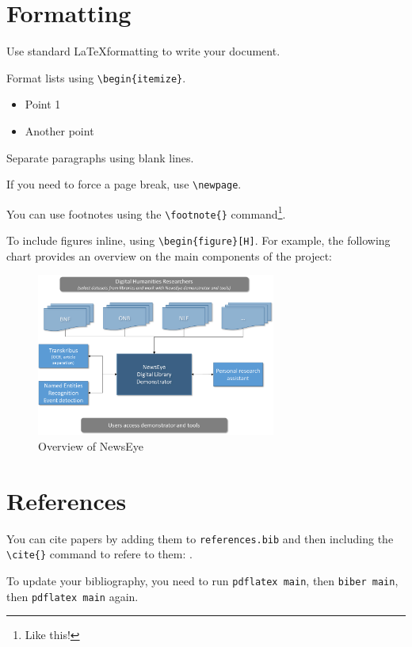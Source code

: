 \documentclass{newseye_del}
\begin{document}
\section{Formatting}
Use standard \LaTeX formatting to write your document.

Format lists using \verb.\begin{itemize}..
\begin{itemize}
    \item Point 1
		\item Another point
\end{itemize}

Separate paragraphs using blank lines.

If you need to force a page break, use \verb.\newpage..

You can use footnotes using the \verb.\footnote{}. command\footnote{%
	Like this!
}.

\newpage

To include figures inline, using \verb.\begin{figure}[H]..
For example, the following chart provides an overview on the main components of the project:

\begin{figure}[H]
	\centering
	\includegraphics[width=0.7\textwidth]{overviewNewsEye.png}

	\caption{Overview of NewsEye}
	\label{fig:place}
\end{figure}



\section{References}
You can cite papers by adding them to \texttt{references.bib}
and then including the \verb.\cite{}. command to refere to them:
\cite{Crane2017}.

To update your bibliography, you need to run \texttt{pdflatex main},
then \texttt{biber main}, then \texttt{pdflatex main} again.
\end{document}
